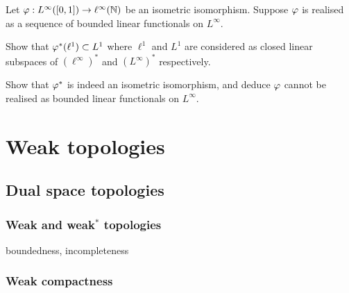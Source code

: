 \documentclass{../note}
\begin{document}
\begin{prb}
Let $\varphi:L^\infty([0,1])\to\ell^\infty(\mathbb{N})$ be an isometric isomorphism.
Suppose $\varphi$ is realised as a sequence of bounded linear functionals on $L^\infty$.
\begin{parts}
\item
Show that $\varphi^*(\ell^1)\subset L^1$ where $\ell^1$ and $L^1$ are considered as closed linear subspaces of $(\ell^\infty)^*$ and $(L^\infty)^*$ respectively.
\item Show that $\varphi^*$ is indeed an isometric isomorphism, and deduce $\varphi$ cannot be realised as bounded linear functionals on $L^\infty$.
\end{parts}
\end{prb}










\part{Weak topologies}
\chapter{Dual space topologies}
\section{Weak and weak$^*$ topologies}
boundedness, incompleteness

\section{Weak compactness}
\begin{prb}
\end{prb}
\begin{prb}
\end{prb}
\begin{prb}
\end{prb}
\end{document}
